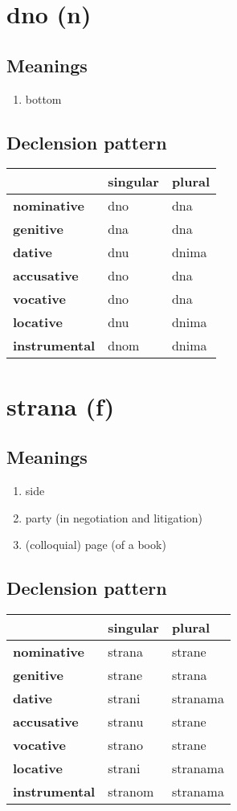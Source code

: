 \filbreak
\section{dno (n)}
\subsection*{Meanings}
\begin{enumerate}
\item bottom
\end{enumerate}
\subsection*{Declension pattern}
\begin{tabularx}{\linewidth}{Xll}
\toprule
{} & singular & plural \\
\midrule
\textbf{nominative  } &      dno &    dna \\
\textbf{genitive    } &      dna &    dna \\
\textbf{dative      } &      dnu &  dnima \\
\textbf{accusative  } &      dno &    dna \\
\textbf{vocative    } &      dno &    dna \\
\textbf{locative    } &      dnu &  dnima \\
\textbf{instrumental} &     dnom &  dnima \\
\bottomrule
\end{tabularx}

\filbreak
\section{strana (f)}
\subsection*{Meanings}
\begin{enumerate}
\item side
\item party (in negotiation and litigation)
\item (colloquial) page (of a book)
\end{enumerate}
\subsection*{Declension pattern}
\begin{tabularx}{\linewidth}{Xll}
\toprule
{} & singular &    plural \\
\midrule
\textbf{nominative  } &   strana &    strane \\
\textbf{genitive    } &   strane &    strana \\
\textbf{dative      } &   strani &  stranama \\
\textbf{accusative  } &   stranu &    strane \\
\textbf{vocative    } &   strano &    strane \\
\textbf{locative    } &   strani &  stranama \\
\textbf{instrumental} &  stranom &  stranama \\
\bottomrule
\end{tabularx}


